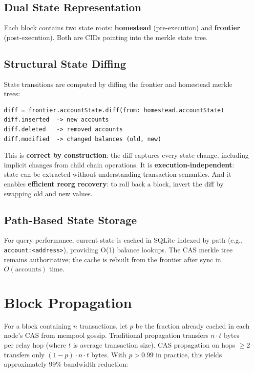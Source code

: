 \documentclass[11pt,a4paper]{article}
\begin{document}
\subsection{Dual State Representation}

Each block contains two state roots: \textbf{homestead} (pre-execution) and \textbf{frontier} (post-execution). Both are CIDs pointing into the merkle state tree.

\subsection{Structural State Diffing}

State transitions are computed by diffing the frontier and homestead merkle trees:

\begin{lstlisting}
diff = frontier.accountState.diff(from: homestead.accountState)
diff.inserted  -> new accounts
diff.deleted   -> removed accounts
diff.modified  -> changed balances (old, new)
\end{lstlisting}

This is \textbf{correct by construction}: the diff captures every state change, including implicit changes from child chain operations. It is \textbf{execution-independent}: state can be extracted without understanding transaction semantics. And it enables \textbf{efficient reorg recovery}: to roll back a block, invert the diff by swapping old and new values.

\subsection{Path-Based State Storage}

For query performance, current state is cached in SQLite indexed by path (e.g., \texttt{account:<address>}), providing O(1) balance lookups. The CAS merkle tree remains authoritative; the cache is rebuilt from the frontier after sync in $O(\text{accounts})$ time.

\section{Block Propagation}

For a block containing $n$ transactions, let $p$ be the fraction already cached in each node's CAS from mempool gossip. Traditional propagation transfers $n \cdot t$ bytes per relay hop (where $t$ is average transaction size). CAS propagation on hops $\geq 2$ transfers only $(1-p) \cdot n \cdot t$ bytes. With $p > 0.99$ in practice, this yields approximately 99\% bandwidth reduction:
\end{document}
